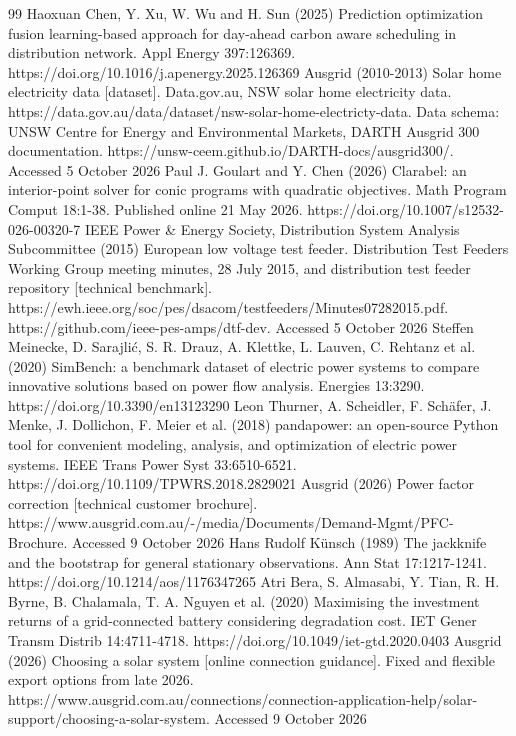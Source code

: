 \documentclass[pdflatex,Numbered,sn-basic]{sn-jnl}
\begin{document}
\begin{thebibliography}{99}
 Haoxuan Chen, Y. Xu, W. Wu and H. Sun (2025) Prediction optimization fusion learning-based approach for day-ahead carbon aware scheduling in distribution network. Appl Energy 397:126369. https://doi.org/10.1016/j.apenergy.2025.126369
 Ausgrid (2010-2013) Solar home electricity data [dataset]. Data.gov.au, NSW solar home electricity data. https://data.gov.au/data/dataset/nsw-solar-home-electricty-data. Data schema: UNSW Centre for Energy and Environmental Markets, DARTH Ausgrid 300 documentation. https://unsw-ceem.github.io/DARTH-docs/ausgrid300/. Accessed 5 October 2026
 Paul J. Goulart and Y. Chen (2026) Clarabel: an interior-point solver for conic programs with quadratic objectives. Math Program Comput 18:1-38. Published online 21 May 2026. https://doi.org/10.1007/s12532-026-00320-7
 IEEE Power \& Energy Society, Distribution System Analysis Subcommittee (2015) European low voltage test feeder. Distribution Test Feeders Working Group meeting minutes, 28 July 2015, and distribution test feeder repository [technical benchmark]. https://ewh.ieee.org/soc/pes/dsacom/testfeeders/Minutes07282015.pdf. https://github.com/ieee-pes-amps/dtf-dev. Accessed 5 October 2026
 Steffen Meinecke, D. Sarajlić, S. R. Drauz, A. Klettke, L. Lauven, C. Rehtanz et al. (2020) SimBench: a benchmark dataset of electric power systems to compare innovative solutions based on power flow analysis. Energies 13:3290. https://doi.org/10.3390/en13123290
 Leon Thurner, A. Scheidler, F. Schäfer, J. Menke, J. Dollichon, F. Meier et al. (2018) pandapower: an open-source Python tool for convenient modeling, analysis, and optimization of electric power systems. IEEE Trans Power Syst 33:6510-6521. https://doi.org/10.1109/TPWRS.2018.2829021
 Ausgrid (2026) Power factor correction [technical customer brochure]. https://www.ausgrid.com.au/-/media/Documents/Demand-Mgmt/PFC-Brochure. Accessed 9 October 2026
 Hans Rudolf Künsch (1989) The jackknife and the bootstrap for general stationary observations. Ann Stat 17:1217-1241. https://doi.org/10.1214/aos/1176347265
 Atri Bera, S. Almasabi, Y. Tian, R. H. Byrne, B. Chalamala, T. A. Nguyen et al. (2020) Maximising the investment returns of a grid-connected battery considering degradation cost. IET Gener Transm Distrib 14:4711-4718. https://doi.org/10.1049/iet-gtd.2020.0403
 Ausgrid (2026) Choosing a solar system [online connection guidance]. Fixed and flexible export options from late 2026. https://www.ausgrid.com.au/connections/connection-application-help/solar-support/choosing-a-solar-system. Accessed 9 October 2026

\end{thebibliography}
\end{document}
